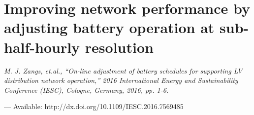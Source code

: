 \chapter{Improving network performance by adjusting battery operation at sub-half-hourly resolution}
\label{ch1}

\singlespacing
\epigraph{\textit{M. J. Zangs, et.al., ``On-line adjustment of battery schedules for supporting LV distribution network operation,'' 2016 International Energy and Sustainability Conference (IESC), Cologne, Germany, 2016, pp. 1-6.}}{--- Available: http://dx.doi.org/10.1109/IESC.2016.7569485}
\doublespacing












